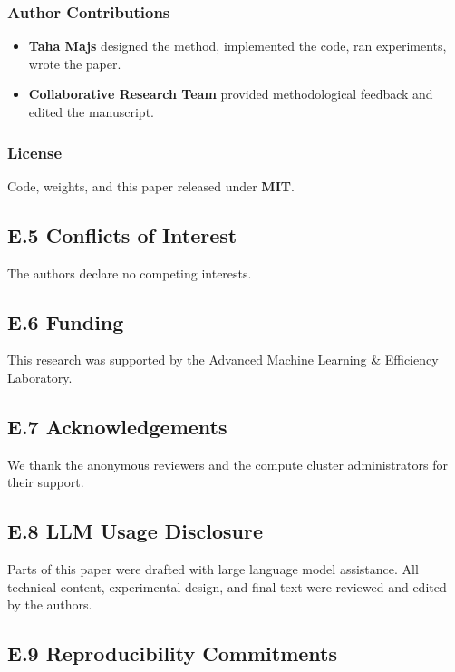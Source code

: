 \subsubsection{Author Contributions}

\begin{itemize}
\item \textbf{Taha Majs} designed the method, implemented the code, ran
  experiments, wrote the paper.
\item \textbf{Collaborative Research Team} provided methodological feedback and edited the manuscript.

\end{itemize}
\subsubsection{License}

Code, weights, and this paper released under \textbf{MIT}.

\subsection{E.5 Conflicts of Interest}

The authors declare no competing interests.

\subsection{E.6 Funding}

This research was supported by the Advanced Machine Learning & Efficiency Laboratory.

\subsection{E.7 Acknowledgements}

We thank the anonymous reviewers and the compute cluster administrators for their support.

\subsection{E.8 LLM Usage Disclosure}

Parts of this paper were drafted with large language model assistance. All 
technical content, experimental design, and final text were reviewed and 
edited by the authors.

\subsection{E.9 Reproducibility Commitments}

